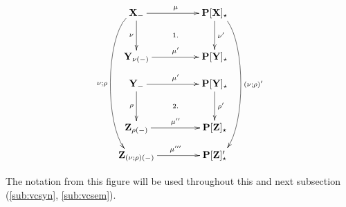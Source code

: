 \begin{figure}[hbt]
\[\xymatrix@R=0.4cm@C=1.5cm{
\thr X_\weak \ar[r]^\mu \ar[dd]_\nu   \ar@(l,l)[dddddd]_{\nu;\rho}  \ar@{}[ddr]|{1.}
  & \thr{P[X]_\cons} \ar[dd]^{\nu'} \ar@(r,r)[dddddd]^{(\nu;\rho)'} \\ \\ 
\thr Y_{\nu(\weak)} \ar[r]^{\mu'} & \thr{P[Y]_\cons} \\ 
%
\thr Y_\weak \ar[r]^{\mu'} \ar[dd]_\rho \ar@{}[ddr]|{2.}
  & \thr{P[Y]_\cons} \ar[dd]^{\rho'} \\ \\ 
\thr Z_{\rho(\weak)} \ar[r]^{\mu''} & \thr{P[Z]_\cons} \\ 
\thr Z_{(\nu;\rho)(\weak)} \ar[r]^{\mu'''} & \thr{P[Z]'_\cons} \\ 
}
\]
\caption{}\label{fi:vertcomp}\vspace*{-1ex}
\end{figure}

\noindent
The notation from this figure will be used throughout this and next
subsection (\ref{sub:vcsyn}, \ref{sub:vcsem}).

